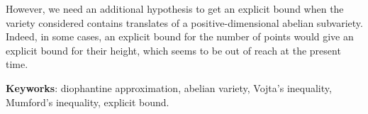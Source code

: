 \documentclass[final, cover]{mpg-preth}
\begin{document}
However, we need an additional hypothesis to get an explicit bound when the
variety considered contains translates of a positive-dimensional abelian
subvariety. Indeed, in some cases, an explicit bound for the number of points
would give an explicit bound for their height, which seems to be out of reach
at the present time.

\medskip\noindent
\textbf{Keyworks}: diophantine approximation, abelian variety, Vojta's
inequality, \mbox{Mumford}'s inequality, explicit bound.
\end{document}
